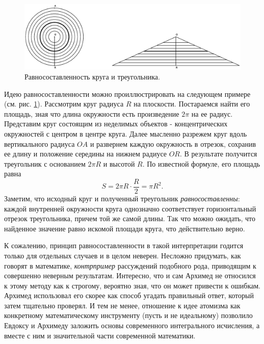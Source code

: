 \begin{figure}[t]
   \centering
   \includegraphics[scale=0.44]{images/archimed_1}
   \caption{Равносоставленность круга и треугольника.}
   \label{fig:archimed_1}
\end{figure}

Идею равносоставленности можно проиллюстрировать на следующем примере (см. рис. \ref{fig:archimed_1}).
Рассмотрим круг радиуса $R$ на плоскости.
Постараемся найти его площадь, зная что длина окружности есть произведение $2\pi$ на ее радиус.
Представим круг состоящим из неделимых объектов - концентрических окружностей с центром в центре круга.
Далее мысленно разрежем круг вдоль вертикального радиуса $OA$ и развернем каждую окружность в отрезок, сохранив ее длину и положение середины на нижнем радиусе $OR$.
В результате получится треугольник с основанием $2\pi R$ и высотой $R$.
По известной формуле, его площадь равна
$$
S = 2\pi R\cdot\frac{R}{2} = \pi R^2.
$$
Заметим, что исходный круг и полученный треугольник \textit{равносоставленны}: каждой внутренней окружности круга однозначно соответствует горизонтальный отрезок треугольника, причем той же самой длины.
Так что можно ожидать, что найденное значение равно искомой площади круга, что действительно верно.

К сожалению, принцип равносоставленности в такой интерпретации годится только для отдельных случаев и в целом неверен. 
Несложно придумать, как говорят в математике, \textit{контрпример} рассуждений подобного рода, приводящим к совершенно неверным результатам.
Интересно, что и сам Архимед не относился к этому методу как к строгому, вероятно зная, что он может привести к ошибкам.
Архимед использовал его скорее как способ угадать правильный ответ, который затем тщательно проверял.
И тем не менее, отношение к идее атомизма как конкретному математическому инструменту (пусть и не идеальному) позволило Евдоксу и Архимеду заложить основы современного интегрального исчисления, а вместе с ним и значительной части современной математики.

